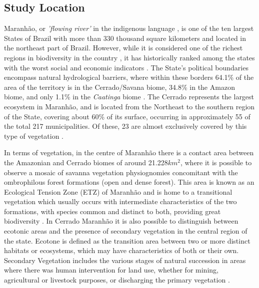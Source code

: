\subsection{Study Location} %


Maranhão, or \textit{'flowing river'} in the indigenous language \citep{girardi_2015}, is one of the ten largest States of Brazil with more than 330 thousand square kilometers and located in the northeast part of Brazil. However, while it is considered one of the richest regions in biodiversity in the country \citep{BATISTELLA_2014}, it has historically ranked among the states with the worst social and economic indicators \citep{CELENTANO_2017}.  The State's political boundaries encompass natural hydrological barriers, where within these borders 64.1\% of the area of the territory is in the Cerrado/Savana biome, 34.8\% in the Amazon biome, and only 1.1\% in the \textit{Caatinga} biome \citep{STELLA_2011}. The Cerrado represents the largest ecosystem in Maranhão, and is located from the Northeast to the southern region of the State, covering about 60\% of its surface, occurring in approximately 55 of the total 217 municipalities. Of these, 23 are almost exclusively covered by this type of vegetation \citep{BATISTELLA_2013}. 

In terms of vegetation, in the centre of Maranhão there is a contact area between the Amazonian and Cerrado biomes of around 21.228$km^2$, where it is possible to observe a mosaic of savanna vegetation physiognomies concomitant with the ombrophilous forest formations (open and dense forest). This area is known as an Ecological Tension Zone (ETZ) of Maranhão and is home to a transitional vegetation which usually occurs with intermediate characteristics of the two formations, with species common and distinct to both, providing great biodiversity \citep{rossatto_2013}. In Cerrado Maranhão it is also possible to distinguish between ecotonic areas and the presence of secondary vegetation in the central region of the state. Ecotone is defined as the transition area between two or more distinct habitats or ecosystems, which may have characteristics of both or their own. Secondary Vegetation includes the various stages of natural succession in areas where there was human intervention for land use, whether for mining, agricultural or livestock purposes, or discharging the primary vegetation \citep{SANTOS-FILHO_2013}. 

